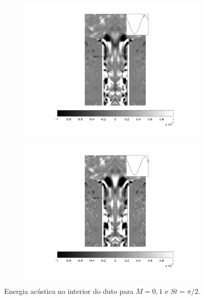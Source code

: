 \begin{landscape}
\begin{figure}[ht!]
\begin{subfigure}{0.55 \textwidth}
  \includegraphics[width=1.\linewidth]{figuras/max_ka_01_5.png}
  \caption[]{}
  \label{fig:max_01_5}
\end{subfigure}
\begin{subfigure}{0.55 \textwidth}
  \includegraphics[width=1.\linewidth]{figuras/max_ka_01_6.png}
  \caption[]{}
  \label{fig:max_01_6}
\end{subfigure}
\caption[Energia acústica para $M = 0,07$ e $St = \pi/2$.]{Energia acústica no interior do duto para $M = 0,1$ e $St = \pi/2$.}\label{fig:max_01}
\end{figure}
\vfill
\clearpage
\end{landscape}


